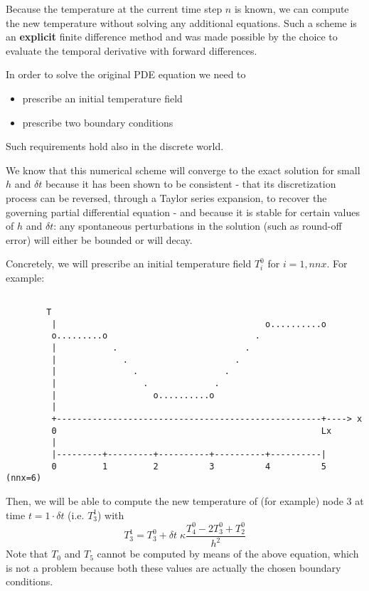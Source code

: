 Because the temperature at the current time step $n$ is known,
we can compute the new temperature without solving any additional equations.
Such a scheme is an {\bf explicit} finite difference method and
was made possible by the choice to evaluate the temporal derivative with forward differences.

In order to solve the original PDE equation we need to
\begin{itemize}
\item prescribe an initial temperature field
\item prescribe two boundary conditions 
\end{itemize}
Such requirements hold also in the discrete world. 

We know that this numerical scheme will converge to the exact solution for
small $h$ and $\delta t$ because it has been shown to be {\color{olive}consistent} - 
that its discretization process
can be reversed, through a Taylor series expansion, to recover the governing partial differential equation -
and because it is {\color{olive}stable} for certain values of
$h$ and $\delta t$: any spontaneous perturbations in the solution (such as round-off error) 
will either be bounded or will decay.

Concretely, we will prescribe an initial temperature field $T_i^0$ for $i=1,nnx$.
For example:
\begin{verbatim}

        T
         |                                         o..........o
         o.........o                             .
         |           .                         . 
         |             .                     .
         |               .                 .
         |                 .             .
         |                   o..........o 
         |
         +----------------------------------------------------+----> x
         0                                                    Lx
         |                    
         |---------+---------+----------+----------+----------| 
         0         1         2          3          4          5       (nnx=6)

\end{verbatim}
Then, we will be able to compute the new temperature of (for example) 
node 3 at time $t=1\cdot \delta t$ 
(i.e. $T_3^1$) with 
\[
T_3^{1}=T_3^0 + \delta t \; \kappa \frac{T_{4}^0 - 2T_3^0 + T_{2}^0}{h^2}
\]
Note that $T_0$ and $T_5$ cannot be computed by means of the above equation, 
which is not a problem because both these values are actually the chosen 
boundary conditions. 



